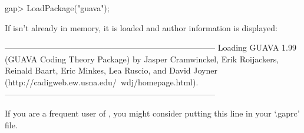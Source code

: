 \beginexample
gap> LoadPackage("guava");
\endexample

If {\GUAVA} isn't  already  in memory,  it is loaded and author information
is displayed:

\begintt
-----------------------------------------------------------------------------
Loading  GUAVA 1.99 (GUAVA Coding Theory Package)
by Jasper Cramwinckel,
   Erik Roijackers,
   Reinald Baart,
   Eric Minkes,
   Lea Ruscio, and
   David Joyner (http://cadigweb.ew.usna.edu/~wdj/homepage.html).
-----------------------------------------------------------------------------
\endtt

If you  are a frequent user of  {\GUAVA}, you might consider putting this
line in your `.gaprc' file.


